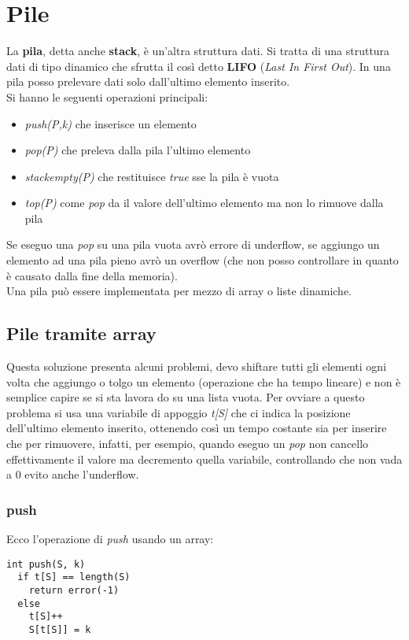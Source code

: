 \documentclass[a4paper,12pt,oneside,tikz]{book}
\begin{document}
\section{Pile}
La \textbf{pila}, detta anche \textbf{stack}, è un'altra struttura dati. Si tratta di una struttura dati di tipo dinamico che sfrutta il così detto \textbf{LIFO} (\textit{Last In First Out}). In una pila posso prelevare dati solo dall'ultimo elemento inserito.\\Si hanno le seguenti operazioni principali:
\begin{itemize}
\item \textit{push(P,k)} che inserisce un elemento
\item \textit{pop(P)} che preleva dalla pila l'ultimo elemento
\item \textit{stackempty(P)} che restituisce \textit{true} sse la pila è vuota
\item \textit{top(P)} come \textit{pop} da il valore dell'ultimo elemento ma non lo rimuove dalla pila
\end{itemize}
Se eseguo una \textit{pop }su una pila vuota avrò errore di underflow, se aggiungo un elemento ad una pila pieno avrò un overflow (che non posso controllare in quanto è causato dalla fine della memoria).\\Una pila può essere implementata per mezzo di array o liste dinamiche.
\subsection{Pile tramite array}
Questa soluzione presenta alcuni problemi, devo shiftare tutti gli elementi ogni volta che aggiungo o tolgo un elemento (operazione che ha tempo lineare) e non è semplice capire se si sta lavora do su una lista vuota. Per ovviare a questo problema si usa una variabile di appoggio \textit{t[S]} che ci indica la posizione dell'ultimo elemento inserito, ottenendo così un tempo costante sia per inserire che per rimuovere, infatti, per esempio, quando eseguo un \textit{pop} non cancello effettivamente il valore ma decremento quella variabile, controllando che non vada a 0 evito anche l'underflow.
\subsubsection{push}
Ecco l'operazione di \textit{push} usando un array:
\begin{verbatim}
int push(S, k)
  if t[S] == length(S)
    return error(-1)
  else
    t[S]++
    S[t[S]] = k
\end{verbatim}
\end{document}
